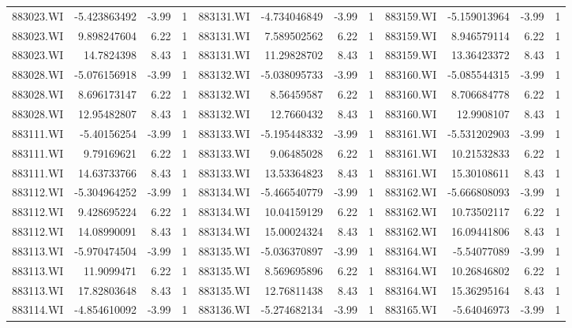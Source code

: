 \documentclass{sysuthesis}
\begin{document}
\begin{table}[htbp]
{\begin{tabular}{rrrrrrrrrrrr}
    883023.WI & -5.423863492 & -3.99 & 1     & 883131.WI & -4.734046849 & -3.99 & 1     & 883159.WI & -5.159013964 & -3.99 & 1 \\
    883023.WI & 9.898247604 & 6.22  & 1     & 883131.WI & 7.589502562 & 6.22  & 1     & 883159.WI & 8.946579114 & 6.22  & 1 \\
    883023.WI & 14.7824398 & 8.43  & 1     & 883131.WI & 11.29828702 & 8.43  & 1     & 883159.WI & 13.36423372 & 8.43  & 1 \\
    883028.WI & -5.076156918 & -3.99 & 1     & 883132.WI & -5.038095733 & -3.99 & 1     & 883160.WI & -5.085544315 & -3.99 & 1 \\
    883028.WI & 8.696173147 & 6.22  & 1     & 883132.WI & 8.56459587 & 6.22  & 1     & 883160.WI & 8.706684778 & 6.22  & 1 \\
    883028.WI & 12.95482807 & 8.43  & 1     & 883132.WI & 12.7660432 & 8.43  & 1     & 883160.WI & 12.9908107 & 8.43  & 1 \\
    883111.WI & -5.40156254 & -3.99 & 1     & 883133.WI & -5.195448332 & -3.99 & 1     & 883161.WI & -5.531202903 & -3.99 & 1 \\
    883111.WI & 9.79169621 & 6.22  & 1     & 883133.WI & 9.06485028 & 6.22  & 1     & 883161.WI & 10.21532833 & 6.22  & 1 \\
    883111.WI & 14.63733766 & 8.43  & 1     & 883133.WI & 13.53364823 & 8.43  & 1     & 883161.WI & 15.30108611 & 8.43  & 1 \\
    883112.WI & -5.304964252 & -3.99 & 1     & 883134.WI & -5.466540779 & -3.99 & 1     & 883162.WI & -5.666808093 & -3.99 & 1 \\
    883112.WI & 9.428695224 & 6.22  & 1     & 883134.WI & 10.04159129 & 6.22  & 1     & 883162.WI & 10.73502117 & 6.22  & 1 \\
    883112.WI & 14.08990091 & 8.43  & 1     & 883134.WI & 15.00024324 & 8.43  & 1     & 883162.WI & 16.09441806 & 8.43  & 1 \\
    883113.WI & -5.970474504 & -3.99 & 1     & 883135.WI & -5.036370897 & -3.99 & 1     & 883164.WI & -5.54077089 & -3.99 & 1 \\
    883113.WI & 11.9099471 & 6.22  & 1     & 883135.WI & 8.569695896 & 6.22  & 1     & 883164.WI & 10.26846802 & 6.22  & 1 \\
    883113.WI & 17.82803648 & 8.43  & 1     & 883135.WI & 12.76811438 & 8.43  & 1     & 883164.WI & 15.36295164 & 8.43  & 1 \\
    883114.WI & -4.854610092 & -3.99 & 1     & 883136.WI & -5.274682134 & -3.99 & 1     & 883165.WI & -5.64046973 & -3.99 & 1 \\

\end{tabular}}
\end{table}
\end{document}
